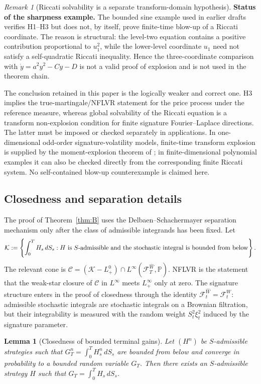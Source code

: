 \documentclass[11pt,oneside]{article}
\theoremstyle{plain}
\newtheorem{lemma}[theorem]{Lemma}
\theoremstyle{definition}
\theoremstyle{remark}
\newtheorem{remark}[theorem]{Remark}
\newcommand{\Pp}{\mathbb{P}}
\newcommand{\FWh}{\mathcal F^{\widehat W}}
\newcommand{\FW}{\mathcal F^W}
\begin{document}
\begin{remark}[Riccati solvability is a separate transform-domain hypothesis]
\textup{\textbf{Status of the sharpness example.}}
The bounded sine example used in earlier drafts verifies H1--H3 but does not, by itself, prove finite-time blow-up of a Riccati coordinate. The reason is structural: the level-two equation contains a positive contribution proportional to $u_1^2$, while the lower-level coordinate $u_1$ need not satisfy a self-quadratic Riccati inequality. Hence the three-coordinate comparison with $\dot y=a^2y^2-Cy-D$ is not a valid proof of explosion and is not used in the theorem chain.

The conclusion retained in this paper is the logically weaker and correct one. H3 implies the true-martingale/NFLVR statement for the price process under the reference measure, whereas global solvability of the Riccati equation is a transform non-explosion condition for finite signature Fourier--Laplace directions. The latter must be imposed or checked separately in applications. In one-dimensional odd-order signature-volatility models, finite-time transform explosion is supplied by the moment-explosion theorem of \citet{AbiJaberGassiatSotnikov2025}; in finite-dimensional polynomial examples it can also be checked directly from the corresponding finite Riccati system. No self-contained blow-up counterexample is claimed here.
\end{remark}

\subsection{Closedness and separation details}
\label{subsec:closedness-separation-details}
The proof of Theorem~\ref{thm:B} uses the Delbaen--Schachermayer separation mechanism only after the class of admissible integrands has been fixed. Let
\[
\mathcal K:=\left\{\int_0^T H_s\,dS_s: H\hbox{ is }S\hbox{-admissible and the stochastic integral is bounded from below}\right\}.
\]
The relevant cone is $\mathcal C=(\mathcal K-L^0_+)\cap L^\infty(\FWh_T,\Pp)$. NFLVR is the statement that the weak-star closure of $\mathcal C$ in $L^\infty$ meets $L^\infty_+$ only at zero. The signature structure enters in the proof of closedness through the identity $\FWh_t=\FW_t$: admissible stochastic integrals are stochastic integrals on a Brownian filtration, but their integrability is measured with the random weight $S_t^2\xi_t^2$ induced by the signature parameter.

\begin{lemma}[Closedness of bounded terminal gains]
\label{lem:closed-terminal-gains}
Let $(H^n)$ be $S$-admissible strategies such that $G^n_T=\int_0^T H^n_s\,dS_s$ are bounded from below and converge in probability to a bounded random variable $G_T$. Then there exists an $S$-admissible strategy $H$ such that $G_T=\int_0^T H_s\,dS_s$.
\end{lemma}
\end{document}
